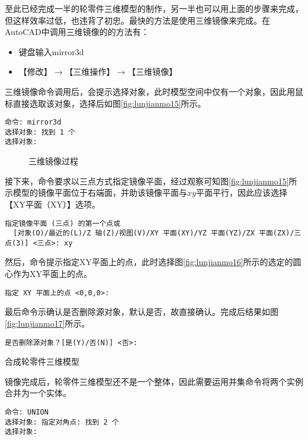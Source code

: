 \begin{procedure}
至此已经完成一半的轮零件三维模型的制作，另一半也可以用上面的步骤来完成，但这样效率过低，也违背了初忠。最快的方法是使用三维镜像来完成。在AutoCAD中调用三维镜像的的方法有：
\begin{itemize}
\item 键盘输入mirror3d
\item 【修改】$\rightarrow $【三维操作】$\rightarrow $【三维镜像】
\end{itemize}

三维镜像命令调用后，会提示选择对象，此时模型空间中仅有一个对象，因此用鼠标直接选取该对象，选择后如图\ref{fig:lunjianmo15}所示。
\begin{lstlisting}
命令: mirror3d
选择对象: 找到 1 个
选择对象:
\end{lstlisting}

\begin{figure}[htbp]
\centering
{}\hspace{20pt}
\hspace{20pt}
\caption{三维镜像过程}
\end{figure}
接下来，命令要求以三点方式指定镜像平面，经过观察可知图\ref{fig:lunjianmo15}所示模型的镜像平面位于右端面，并助该镜像平面与$xy$平面平行，因此应该选择【XY平面（XY）】选项。
\begin{lstlisting}
指定镜像平面 (三点) 的第一个点或
  [对象(O)/最近的(L)/Z 轴(Z)/视图(V)/XY 平面(XY)/YZ 平面(YZ)/ZX 平面(ZX)/三点(3)] <三点>: xy
\end{lstlisting}

然后，命令提示指定XY平面上的点，此时选择图\ref{fig:lunjianmo16}所示的选定的圆心作为XY平面上的点。
\begin{lstlisting}
指定 XY 平面上的点 <0,0,0>:
\end{lstlisting}
最后命令示确认是否删除源对象，默认是否，故直接确认。完成后结果如图\ref{fig:lunjianmo17}所示。
\begin{lstlisting}
是否删除源对象？[是(Y)/否(N)] <否>:
\end{lstlisting}

\item 合成轮零件三维模型

镜像完成后，轮零件三维模型还不是一个整体，因此需要运用并集命令将两个实例合并为一个实体。
\begin{lstlisting}
命令: UNION
选择对象: 指定对角点: 找到 2 个
选择对象:
\end{lstlisting}


\end{procedure}

